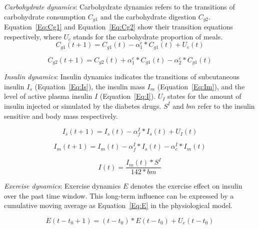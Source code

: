 

\emph{Carbohydrate dynamics}: Carbohydrate dynamics refers to the transitions of carbohydrate consumption  $C_{g1}$ and the carbohydrate digestion $C_{g2}$. 
Equation~\ref{Eq:Cg1}  and Equation~\ref{Eq:Cg2} show their transition equations respectively, where $U_{c}$ stands for the carbohydrate proportion of meals.
\begin{equation}\label{Eq:Cg1}
C_{g1}(t+1)=C_{g1}(t)-\alpha_{1}^c*C_{g1}(t)+U_{c}(t)
\end{equation}

\begin{equation}\label{Eq:Cg2}
C_{g2}(t+1)=C_{g2}(t)+\alpha_{1}^c*C_{g1}(t)-\alpha_{2}^c*C_{g1}(t)
\end{equation}

\emph{Insulin dynamics}: Insulin dynamics indicates the transitions of subcutaneous insulin $I_{s}$ (Equation~\ref{Eq:Is}), 
the insulin mass $I_{m}$ (Equation~\ref{Eq:Im}),  and the level of active plasma insulin $I$ (Equation~\ref{Eq:I}). $U_{I}$ 
states for the amount of insulin injected or simulated by the diabetes drugs. $S^I$ and $bm$ refer to the insulin sensitive 
and body mass respectively.

\begin{equation}\label{Eq:Is}
I_{s}(t+1)=I_{s}(t)-\alpha_{f}^I*I_{s}(t)+U_{I}(t)
\end{equation}


\begin{equation}\label{Eq:Im}
I_{m}(t+1)=I_{m}(t)-\alpha_{f}^I*I_{s}(t)-\alpha_c^I*I_{m}(t)
\end{equation}

\begin{equation}\label{Eq:I}
I(t)=\frac{I_{m}(t)*S^I}{142*bm}
\end{equation}

\emph{Exercise dynamics}: Exercise dynamics $E$ denotes the exercise effect on insulin over the past time window. This 
long-term influence can be expressed by a cumulative moving average \cite{bib:lowry1992multivariate, bib:cma} as Equation~\ref{Eq:E} in the physiological model.

\begin{equation}\label{Eq:E}
E(t-t_0+1)=(t-t_0)*E(t-t_0)+U_{e}(t-t_0)
\end{equation}

